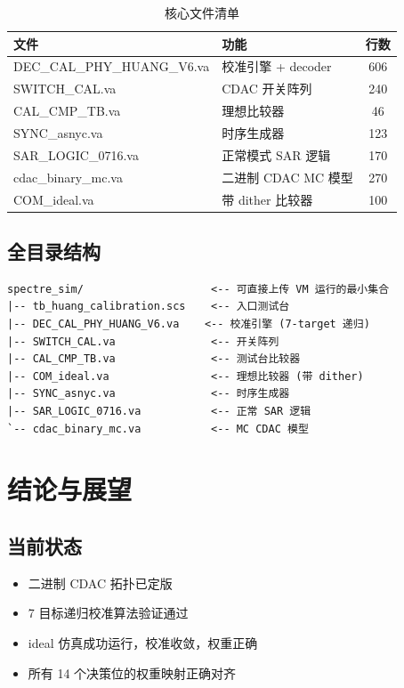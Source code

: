 \documentclass[12pt,a4paper]{article}
\begin{document}
\begin{table}[H]
\centering
\caption{核心文件清单}
\begin{tabular}{llc}
\toprule
文件 & 功能 & 行数 \\
\midrule
DEC\_CAL\_PHY\_HUANG\_V6.va & 校准引擎 + decoder & 606 \\
SWITCH\_CAL.va & CDAC 开关阵列 & 240 \\
CAL\_CMP\_TB.va & 理想比较器 & 46 \\
SYNC\_asnyc.va & 时序生成器 & 123 \\
SAR\_LOGIC\_0716.va & 正常模式 SAR 逻辑 & 170 \\
cdac\_binary\_mc.va & 二进制 CDAC MC 模型 & 270 \\
COM\_ideal.va & 带 dither 比较器 & 100 \\
\bottomrule
\end{tabular}
\end{table}

\subsection{全目录结构}
\begin{lstlisting}[basicstyle=\tiny\ttfamily]
spectre_sim/                    <-- 可直接上传 VM 运行的最小集合
|-- tb_huang_calibration.scs    <-- 入口测试台
|-- DEC_CAL_PHY_HUANG_V6.va    <-- 校准引擎 (7-target 递归)
|-- SWITCH_CAL.va               <-- 开关阵列
|-- CAL_CMP_TB.va               <-- 测试台比较器
|-- COM_ideal.va                <-- 理想比较器 (带 dither)
|-- SYNC_asnyc.va               <-- 时序生成器
|-- SAR_LOGIC_0716.va           <-- 正常 SAR 逻辑
`-- cdac_binary_mc.va           <-- MC CDAC 模型
\end{lstlisting}

\section{结论与展望}

\subsection{当前状态}
\begin{itemize}
  \item 二进制 CDAC 拓扑已定版
  \item 7 目标递归校准算法验证通过
  \item ideal 仿真成功运行，校准收敛，权重正确
  \item 所有 14 个决策位的权重映射正确对齐
\end{itemize}
\end{document}
